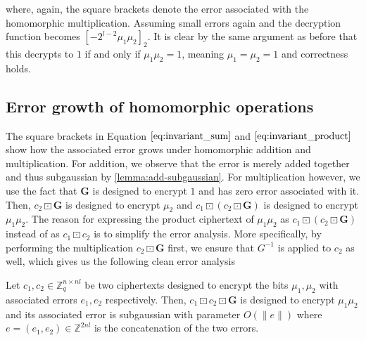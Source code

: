where, again, the square brackets denote the error associated with the homomorphic multiplication. Assuming small errors again and the decryption function becomes $[-2^{l-2}\mu_1 \mu_2]_2$. It is clear by the same argument as before that this decrypts to $1$ if and only if $\mu_1 \mu_2 = 1$, meaning $\mu_1 = \mu_2 = 1$ and correctness holds.

\subsection*{Error growth of homomorphic operations}
The square brackets in Equation $\ref{eq:invariant_sum}$ and $\ref{eq:invariant_product}$ show how the associated error grows under homomorphic addition and multiplication. For addition, we observe that the error is merely added together and thus subgaussian by \ref{lemma:add-subgaussian}. For multiplication however, we use the fact that $\mathbf{G}$ is designed to encrypt $1$ and has zero error associated with it. Then, $c_2 \boxdot \mathbf{G}$ is designed to encrypt $\mu_2$ and $c_1 \boxdot (c_2 \boxdot \mathbf{G})$ is designed to encrypt $\mu_1 \mu_2$. The reason for expressing the product ciphertext of $\mu_1 \mu_2$ as $c_1 \boxdot (c_2 \boxdot \mathbf{G})$ instead of as $c_1 \boxdot c_2$ is to simplify the error analysis. More specifically, by performing the multiplication $c_2 \boxdot \mathbf{G}$ first, we ensure that $G^{-1}$ is applied to $c_2$ as well, which gives us the following clean error analysis
\begin{theorem}\label{thm:hom_product}
    Let $c_1, c_2 \in \mathbb{Z}_q^{n \times nl}$ be two ciphertexts designed to encrypt the bits $\mu_1, \mu_2$ with associated errors $e_1, e_2$ respectively. Then, $c_1 \boxdot c_2 \boxdot \mathbf{G}$ is designed to encrypt $\mu_1 \mu_2$ and its associated error is subgaussian with parameter $O(\|e\|)$ where $e = (e_1, e_2) \in \mathbb{Z}^{2nl}$ is the concatenation of the two errors. 
\end{theorem}
